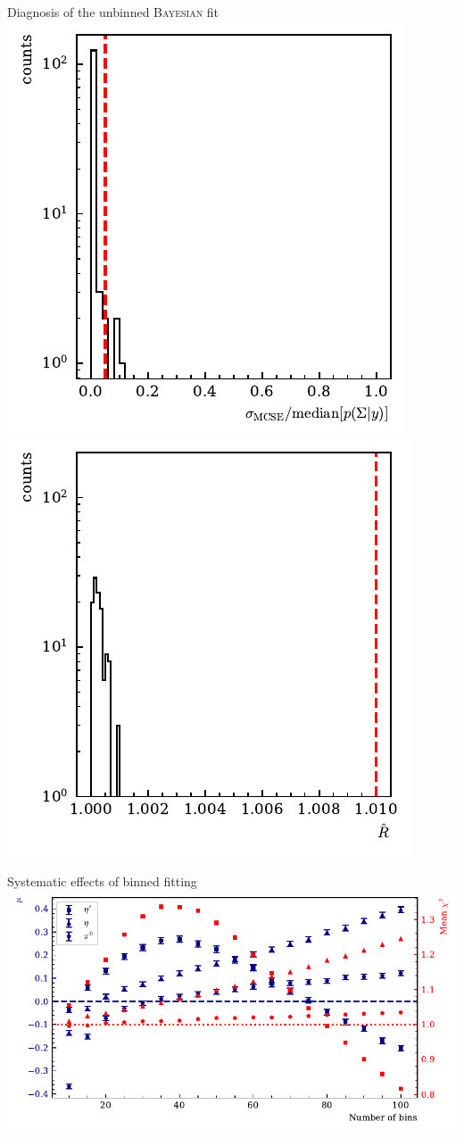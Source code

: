 \documentclass[11pt,aspectratio=169,dvipsnames]{beamer}
\begin{document}
\begin{frame}{Diagnosis of the unbinned \textsc{Bayesian} fit}
	\includegraphics[width=.49\linewidth]{../../bayes/event_based_fit/plots/mcse_hist.pdf}
		\includegraphics[width=.49\linewidth]{../../bayes/event_based_fit/plots/rhat_hist.pdf}
\end{frame}
\begin{frame}{Systematic effects of binned fitting}
	\includegraphics[width=\linewidth]{../../bayes/toyMC/plots/binnedfits.pdf}
\end{frame}
\end{document}
